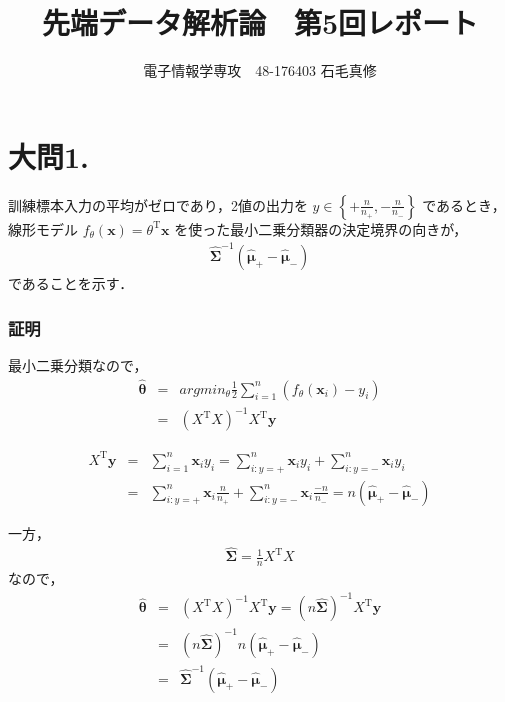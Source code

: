 \documentclass[fleqn]{jsarticle}
\begin{document}
\newcommand{\argmax}{\mathop{\rm argmax}\limits}
\newcommand{\argmin}{\mathop{\rm argmin}\limits}

\title{先端データ解析論　第5回レポート}
\author{電子情報学専攻　48-176403 石毛真修}
\maketitle



\section*{大問1.}
訓練標本入力の平均がゼロであり，2値の出力を $y \in \left\{ +\frac{n}{n_+}, -\frac{n}{n_-} \right\}$ であるとき，
線形モデル $f_\theta(\mathbf x) = \theta^{\mathrm T} \mathbf x$ を使った最小二乗分類器の決定境界の向きが，
\begin{eqnarray*}
  {\hat {\mathbf \Sigma}}^{-1} ({\hat {\mathbf \mu}}_+ - {\hat {\mathbf \mu}}_- )
\end{eqnarray*}
であることを示す．

\subsubsection*{証明}
最小二乗分類なので，
\begin{eqnarray*}
  \hat {\mathbf \theta} &=& argmin_\theta \frac{1}{2} \sum^n_{i=1} \left(f_\theta({\mathbf x}_i ) - y_i \right)\\
  &=& \left(X^{\mathrm T} X \right)^{-1} X^{\mathrm T} {\mathbf y}
\end{eqnarray*}

\begin{eqnarray*}
  X^{\mathrm T} {\mathbf y} &=& \sum^n_{i=1} {\mathbf x}_i y_i
  = \sum^n_{i:y=+} {\mathbf x}_i y_i + \sum^n_{i:y=-} {\mathbf x}_i y_i\\
  &=& \sum^n_{i:y=+} {\mathbf x}_i \frac{n}{n_+} + \sum^n_{i:y=-} {\mathbf x}_i \frac{- n}{n_-}
  = n (\hat{\mathbf \mu}_+ - \hat{\mathbf \mu}_-)
\end{eqnarray*}


一方，
\begin{eqnarray*}
  \hat {\mathbf \Sigma} = \frac{1}{n} X^{\mathrm T} X
\end{eqnarray*}
なので，
\begin{eqnarray*}
  \hat {\mathbf \theta} &=& \left(X^{\mathrm T} X \right)^{-1} X^{\mathrm T} {\mathbf y}
  = \left(n \hat {\mathbf \Sigma} \right)^{-1} X^{\mathrm T} {\mathbf y}\\
  &=& \left(n \hat {\mathbf \Sigma} \right)^{-1} n \left(\hat{\mathbf \mu}_+ - \hat{\mathbf \mu}_- \right) \\
  &=& {\hat {\mathbf \Sigma}}^{-1} \left(\hat{\mathbf \mu}_+ - \hat{\mathbf \mu}_- \right) \\
\end{eqnarray*}
\end{document}
